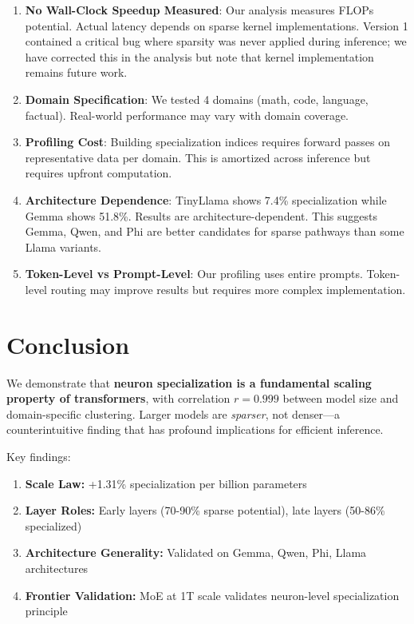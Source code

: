 \documentclass{article}
\begin{document}
\begin{enumerate}
    \item \textbf{No Wall-Clock Speedup Measured}: Our analysis measures FLOPs potential. Actual latency depends on sparse kernel implementations. Version 1 contained a critical bug where sparsity was never applied during inference; we have corrected this in the analysis but note that kernel implementation remains future work.

    \item \textbf{Domain Specification}: We tested 4 domains (math, code, language, factual). Real-world performance may vary with domain coverage.

    \item \textbf{Profiling Cost}: Building specialization indices requires forward passes on representative data per domain. This is amortized across inference but requires upfront computation.

    \item \textbf{Architecture Dependence}: TinyLlama shows 7.4\% specialization while Gemma shows 51.8\%. Results are architecture-dependent. This suggests Gemma, Qwen, and Phi are better candidates for sparse pathways than some Llama variants.

    \item \textbf{Token-Level vs Prompt-Level}: Our profiling uses entire prompts. Token-level routing may improve results but requires more complex implementation.
\end{enumerate}

\section{Conclusion}

We demonstrate that \textbf{neuron specialization is a fundamental scaling property of transformers}, with correlation $r = 0.999$ between model size and domain-specific clustering. Larger models are \textit{sparser}, not denser---a counterintuitive finding that has profound implications for efficient inference.

Key findings:
\begin{enumerate}
    \item \textbf{Scale Law:} +1.31\% specialization per billion parameters
    \item \textbf{Layer Roles:} Early layers (70-90\% sparse potential), late layers (50-86\% specialized)
    \item \textbf{Architecture Generality:} Validated on Gemma, Qwen, Phi, Llama architectures
    \item \textbf{Frontier Validation:} MoE at 1T scale validates neuron-level specialization principle
\end{enumerate}
\end{document}
